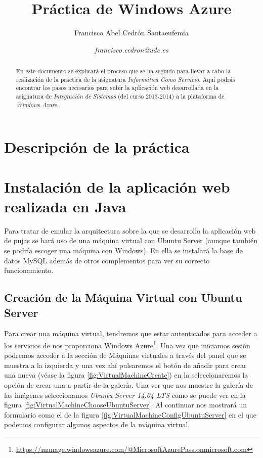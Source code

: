 \documentclass{article}
\title{\textbf{Práctica de Windows Azure}
}
\author{Francisco Abel Cedrón Santaeufemia \and \textit{francisco.cedron@udc.es}}
\date{} %
\begin{document}
\maketitle %
\renewcommand{\abstractname}{Abstract} %
\begin{abstract}
En este documento se explicará el proceso que se ha seguido para llevar a cabo la realización de la práctica de la asignatura \emph{Informática Como Servicio}. Aquí podrás encontrar los pasos necesarios para subir la aplicación web desarrollada en la asignatura de \emph{Integración de Sistemas} (del curso 2013-2014) a la plataforma de \emph{Windows Azure}.
\end{abstract}
\renewcommand{\contentsname}{} %
{\setlength{\parskip}{0mm} \tableofcontents} %


\section{Descripción de la práctica}

\section{Instalación de la aplicación web realizada en Java}
	Para tratar de emular la arquitectura sobre la que se desarrollo la aplicación web de pujas se hará uso de una máquina virtual con Ubuntu Server (aunque también se podría escoger una máquina con Windows). En ella se instalará la base de datos MySQL además de otros complementos para ver su correcto funcionamiento.


\subsection{Creación de la Máquina Virtual con Ubuntu Server}

	Para crear una máquina virtual, tendremos que estar autenticados para acceder a los servicios de nos proporciona Windows Azure\footnote{\url{https://manage.windowsazure.com/@MicrosoftAzurePass.onmicrosoft.com}}. Una vez que iniciamos sesión podremos acceder a la sección de Máquinas virtuales a través del panel que se muestra a la izquierda y una vez ahí pulsaremos el botón de añadir para crear una nueva (véase la figura \ref{fig:VirtualMachineCreate}) en la seleccionaremos la opción de crear una a partir de la galería. Una ver que nos muestre la galería de las imágenes seleccionamos \emph{Ubuntu Server 14.04 LTS} como se puede ver en la figura \ref{fig:VirtualMachineChooseUbuntuServer}. Al continuar nos mostrará un formulario como el de la figura \ref{fig:VirtualMachineConfigUbuntuServer} en el que podemos configurar algunos aspectos de la máquina virtual.
\end{document}

